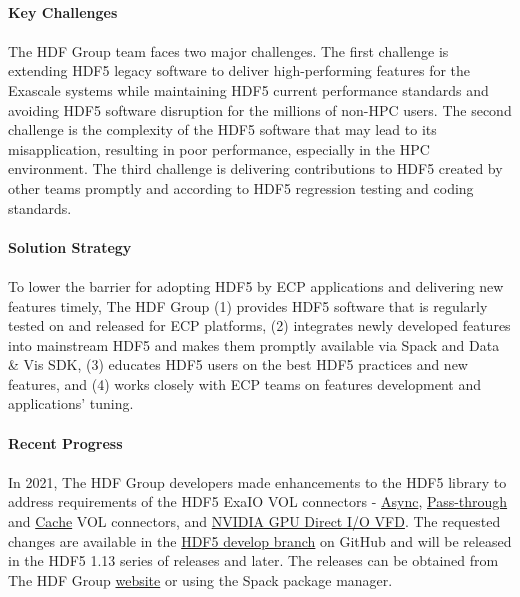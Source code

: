 \paragraph{Key  Challenges}
\paragraph{}

The HDF Group team faces two major challenges. The first challenge is extending HDF5 legacy software to deliver high-performing features for the Exascale systems while maintaining HDF5 current performance standards and avoiding HDF5 software disruption for the millions of non-HPC users. The second challenge is the complexity of the HDF5 software that may lead to its misapplication, resulting in poor performance, especially in the HPC environment. The third challenge is delivering contributions to HDF5 created by other teams promptly and according to HDF5 regression testing and coding standards.

\paragraph{Solution Strategy}
\paragraph{}
To lower the barrier for adopting HDF5 by ECP applications and delivering new features timely, The HDF Group (1) provides HDF5 software that is regularly tested on and released for ECP platforms, (2) integrates newly developed features into mainstream HDF5 and makes them promptly available via Spack and Data \& Vis SDK, (3) educates HDF5 users on the best HDF5 practices and new features, and (4) works closely with ECP teams on features development and applications’ tuning. 

\paragraph{Recent Progress}
\paragraph{}
In 2021, The HDF Group developers made enhancements to the HDF5 library to address requirements of the HDF5 ExaIO VOL connectors - \href{https://github.com/hpc-io/vol-async}{Async}, \href{https://github.com/hpc-io/vol-external-passthrough}{Pass-through} and \href{https://github.com/hpc-io/vol-cache}{Cache} VOL connectors, and \href{https://github.com/hpc-io/vfd-gds}{NVIDIA GPU Direct I/O VFD}. The requested changes are available in the \href{https://github.com/HDFGroup/hdf5}{HDF5 develop branch} on GitHub and will be released in the HDF5 1.13 series of releases and later. The releases can be obtained from The HDF Group \href{https://portal.hdfgroup.org/display/support/Downloads}{website} or using the Spack package manager.  

